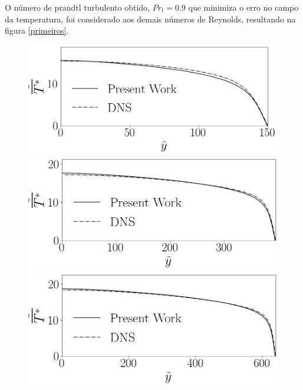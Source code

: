 O número de prandtl turbulento obtido, $Pr_t = 0.9$ que minimiza o erro no campo da temperatura, foi considerado aos demais números de Reynolds, resultando na figura \ref{primeiros}.

\begin{figure}[!h]
	\centering
	\begin{minipage}[t]{0.5\textwidth}
		\centering
		\includegraphics[angle=0, scale=0.34]{fotos_formatacao_final/Temperature_150_071_Prt0905_A26}
	\end{minipage}
	\begin{minipage}[t]{0.45\textwidth}
		\centering
		\includegraphics[angle=0, scale=0.34]{fotos_formatacao_final/Temperature_395_071_Prt0905_A26}
	\end{minipage}
	\begin{minipage}[t]{0.5\textwidth}
		\centering
		\includegraphics[angle=0, scale=0.34]{fotos_formatacao_final/Temperature_640_071_Prt0905_A26}

\end{minipage}
\end{figure}
